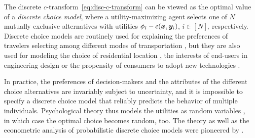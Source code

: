 \documentclass[11pt, a4paper, oneside, reqno]{article}
\begin{document}
	
	The discrete $c$-transform~\eqref{eq:disc-c-transform} can be viewed as the optimal value of a {\em discrete choice model}, where a utility-maximizing agent selects one of $N$ mutually exclusive alternatives with utilities $\phi_i - c(\boldsymbol x, \boldsymbol y_i)$, $i\in[N]$, respectively. Discrete choice models are routinely used for explaining the preferences of travelers selecting among different modes of transportation \citep{ben1985discrete}, but they are also used for modeling the choice of residential location \citep{mcfadden1978modeling}, the interests of end-users in engineering design \citep{wassenaar2003approach} or the propensity of consumers to adopt new technologies \citep{hackbarth2013consumer}.
	
	In practice, the preferences of decision-makers and the attributes of the different choice alternatives are invariably subject to uncertainty, and it is impossible to specify a discrete choice model that reliably predicts the behavior of multiple individuals. Psychological theory thus models the utilities as random variables \citep{thurstone1927law}, in which case the optimal choice becomes random, too. The theory as well as the econometric analysis of probabilistic discrete choice models were pioneered by \citet{mcfadden1973conditional}.
	
	
	
\end{document}
